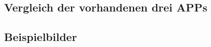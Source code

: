 \subsection{\textbf{Vergleich der vorhandenen drei \acs{APP}s}}
\begin{landscape}

\newpage






\end{landscape}


\subsection{\textbf{Beispielbilder}}

